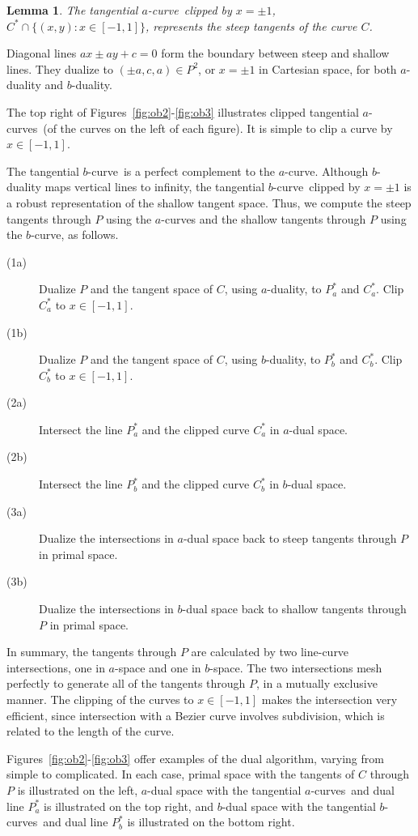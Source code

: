 \documentclass[twocolumn,10pt]{article}
\newcommand{\prf}{\noindent{{\bf Proof}:\ \ \ }}
\newcommand{\QED}{\vrule height 1.4ex width 1.0ex depth -.1ex\ \vspace{.2in}} %
\newcommand{\atang}{tangential $a$-curve\ }
\newcommand{\btang}{tangential $b$-curve\ }
\newcommand{\atangs}{tangential $a$-curves\ }
\newcommand{\btangs}{tangential $b$-curves\ }
\newtheorem{lemma}[theorem]{Lemma}
\begin{document}
\begin{lemma}
The \atang clipped by $x = \pm 1$,
$C^* \cap \{(x,y) : x \in [-1,1] \}$,
represents the steep tangents of the curve $C$.
\end{lemma}
\prf
Diagonal lines $ax \pm ay+c=0$ form the boundary between steep and shallow lines.
They dualize to $(\pm a,c,a) \in P^2$, or $x=\pm 1$ in Cartesian space,
for both $a$-duality and $b$-duality.
\QED

The top right of Figures~\ref{fig:ob2}-\ref{fig:ob3} illustrates
clipped \atangs (of the curves on the left of each figure).
It is simple to clip a curve by $x \in [-1,1]$.

The \btang is a perfect complement to the $a$-curve.
Although $b$-duality maps vertical lines to infinity,
the \btang clipped by $x = \pm 1$ is a robust representation of the 
shallow tangent space.
Thus, we compute the steep tangents through $P$ using the $a$-curves
and the shallow tangents through $P$ using the $b$-curve, as follows.
%
\begin{description}
\item[(1a)]	Dualize $P$ and the tangent space of $C$, using $a$-duality,
		to $P_a^*$ and $C_a^*$.  Clip $C_a^*$ to $x \in [-1,1]$.
\item[(1b)]	Dualize $P$ and the tangent space of $C$, using $b$-duality,
		to $P_b^*$ and $C_b^*$.  Clip $C_b^*$ to $x \in [-1,1]$.
\item[(2a)]	Intersect the line $P_a^*$ and the clipped curve $C_a^*$ 
		in $a$-dual space.
\item[(2b)]	Intersect the line $P_b^*$ and the clipped curve 
		$C_b^*$ in $b$-dual space.
\item[(3a)]	Dualize the intersections in $a$-dual space 
		back to steep tangents through $P$ in primal space.
\item[(3b)]	Dualize the intersections in $b$-dual space 
		back to shallow tangents through $P$ in primal space.
\end{description}

In summary, the tangents through $P$ are calculated by two line-curve
intersections, one in $a$-space and one in $b$-space.
The two intersections mesh perfectly to generate all of the 
tangents through $P$, in a mutually exclusive manner.
The clipping of the curves to $x \in [-1,1]$ makes the intersection very efficient,
since intersection with a Bezier curve involves subdivision,
which is related to the length of the curve.

Figures~\ref{fig:ob2}-\ref{fig:ob3} offer examples of the dual algorithm,
varying from simple to complicated.
In each case, primal space with the tangents of $C$ through $P$ is illustrated
on the left, $a$-dual space with the \atangs and dual line $P_a^*$ is illustrated
on the top right, and $b$-dual space with the \btangs and dual line $P_b^*$ 
is illustrated on the bottom right.
\end{document}
